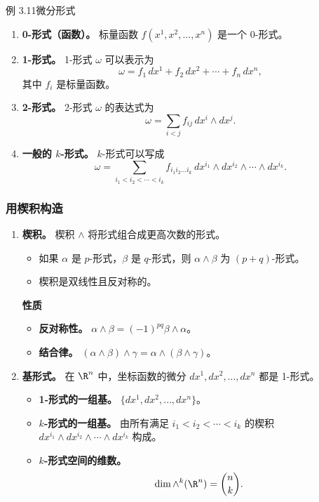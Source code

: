 \begin{statement}{例 3.11}{微分形式}
\begin{enumerate}[label=\alph*.]
\item \textbf{0-形式（函数）。} 标量函数 $f(x^1,x^2,\dots,x^n)$ 是一个 0-形式。
\item \textbf{1-形式。} 1-形式 $\omega$ 可以表示为
\[
  \omega=f_1\,dx^1+f_2\,dx^2+\cdots+f_n\,dx^n,
\]
其中 $f_i$ 是标量函数。
\item \textbf{2-形式。} 2-形式 $\omega$ 的表达式为
\[
  \omega=\sum_{i<j}f_{ij}\,dx^i\wedge dx^j.
\]
\item \textbf{一般的 $k$-形式。} $k$-形式可以写成
\[
  \omega=\sum_{i_1<i_2<\cdots<i_k} f_{i_1 i_2\dots i_k}\,
  dx^{i_1}\wedge dx^{i_2}\wedge\cdots\wedge dx^{i_k}.
\]
\end{enumerate}
\end{statement}

\subsubsection{用楔积构造}
\begin{enumerate}[label=\alph*.]
\item \textbf{楔积。} 楔积 $\wedge$ 将形式组合成更高次数的形式。
\begin{itemize}
\item 如果 $\alpha$ 是 $p$-形式，$\beta$ 是 $q$-形式，则 $\alpha\wedge\beta$ 为 $(p+q)$-形式。
\item 楔积是双线性且反对称的。
\end{itemize}
\textbf{性质}
\begin{itemize}
\item \textbf{反对称性。} $\alpha\wedge\beta=(-1)^{pq}\beta\wedge\alpha$。
\item \textbf{结合律。} $(\alpha\wedge\beta)\wedge\gamma=\alpha\wedge(\beta\wedge\gamma)$。
\end{itemize}
\item \textbf{基形式。} 在 $\R^n$ 中，坐标函数的微分 $dx^1,dx^2,\dots,dx^n$ 都是 1-形式。
\begin{itemize}
\item \textbf{1-形式的一组基。} $\{dx^1,dx^2,\dots,dx^n\}$。
\item \textbf{$k$-形式的一组基。} 由所有满足 $i_1<i_2<\cdots<i_k$ 的楔积 $dx^{i_1}\wedge dx^{i_2}\wedge\cdots\wedge dx^{i_k}$ 构成。
\item \textbf{$k$-形式空间的维数。}
\[
  \dim\wedge^k(\R^n)=\binom{n}{k}.
\]
\end{itemize}
\end{enumerate}

